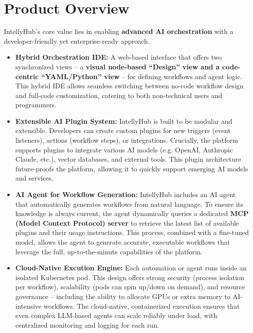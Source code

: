 \documentclass[11pt, a4paper, oneside]{article}
\begin{document}
\section{Product Overview}
IntellyHub's core value lies in enabling \textbf{advanced AI orchestration} with a developer-friendly yet enterprise-ready approach.
\begin{itemize}
    \item \textbf{Hybrid Orchestration IDE:} A web-based interface that offers two synchronized views – a \textbf{visual node-based “Design” view and a code-centric “YAML/Python” view} – for defining workflows and agent logic. This hybrid IDE allows seamless switching between no-code workflow design and full-code customization, catering to both non-technical users and programmers.
    
    \item \textbf{Extensible AI Plugin System:} IntellyHub is built to be modular and extensible. Developers can create custom plugins for new triggers (event listeners), actions (workflow steps), or integrations. Crucially, the platform supports plugins to integrate various AI models (e.g. OpenAI, Anthropic Claude, etc.), vector databases, and external tools. This plugin architecture future-proofs the platform, allowing it to quickly support emerging AI models and services.
    
    \item \textbf{AI Agent for Workflow Generation:} IntellyHub includes an AI agent that automatically generates workflows from natural language. To ensure its knowledge is always current, the agent dynamically queries a dedicated \textbf{MCP (Model Context Protocol) server} to retrieve the latest list of available plugins and their usage instructions. This process, combined with a fine-tuned model, allows the agent to generate accurate, executable workflows that leverage the full, up-to-the-minute capabilities of the platform.
    
    \item \textbf{Cloud-Native Excution Engine:} Each automation or agent runs inside an isolated Kubernetes pod. This design offers strong security (process isolation per workflow), scalability (pods can spin up/down on demand), and resource governance – including the ability to allocate GPUs or extra memory to AI-intensive workflows. The cloud-native, containerized execution ensures that even complex LLM-based agents can scale reliably under load, with centralized monitoring and logging for each run.
    

\end{itemize}
\end{document}
